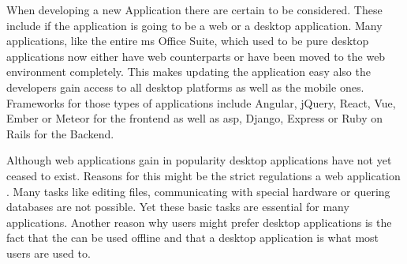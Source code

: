 
When developing a new Application there are certain  to be considered. These include if the application is going to be a web or a desktop application. Many applications, like the entire \gls{ms} Office Suite, which used to be pure desktop applications now either have web counterparts or have been moved to the web environment completely. This makes updating the application easy also the developers gain access to all desktop platforms as well as the mobile ones. Frameworks for those types of applications include Angular, jQuery, React, Vue, Ember or Meteor for the frontend as well as \gls{asp}, Django, Express or Ruby on Rails for the Backend.

Although web applications gain in popularity desktop applications have not yet ceased to exist. Reasons for this might be the strict regulations a web application . Many tasks like editing files, communicating with special hardware or quering databases are not possible. Yet these basic tasks are essential for many applications. Another reason why users might prefer desktop applications is the fact that the can be used offline and that a desktop application is what most users are used to.
